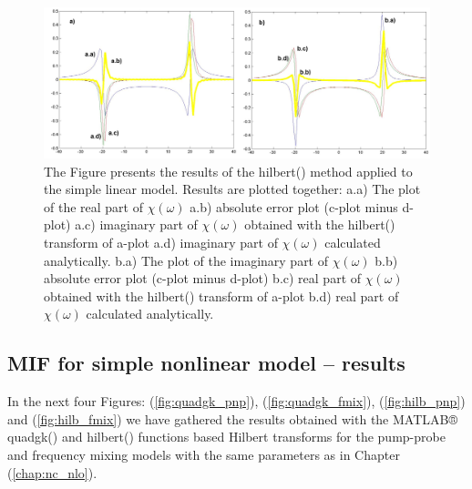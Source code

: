 \documentclass[12pt,twoside,a4paper]{article}
\numberwithin{equation}{subsection}
\numberwithin{figure}{subsection}
\begin{document}
\begin{figure} 
  \includegraphics[width=150mm]{img/hilb_lin.png}
  \caption{The Figure presents the results of the hilbert() method applied to the simple linear model. Results are plotted together:
   a.a) The plot of the real part of $\chi (\omega )$ 
   a.b) absolute error plot (c-plot minus d-plot) 
   a.c) imaginary part of $\chi (\omega )$ obtained with the hilbert() transform of a-plot 
   a.d) imaginary part of $\chi (\omega )$  calculated analytically. 
   b.a) The plot of the imaginary part of $\chi (\omega )$ 
   b.b) absolute error plot (c-plot minus d-plot) 
   b.c) real part of $\chi (\omega )$ obtained with the hilbert() transform of a-plot 
   b.d) real part of $\chi (\omega )$ calculated analytically. \label{fig:hilb_lin}
  }
\end{figure}

\subsection{MIF for simple nonlinear model -- results} \label{chap:matlab_nlo}

In the next four Figures: (\ref{fig:quadgk_pnp}), (\ref{fig:quadgk_fmix}), (\ref{fig:hilb_pnp}) and (\ref{fig:hilb_fmix}) we have gathered the results obtained with the MATLAB® quadgk() and hilbert() functions based Hilbert transforms for the pump-probe and frequency mixing models with the same parameters as in Chapter (\ref{chap:nc_nlo}). 
\end{document}
